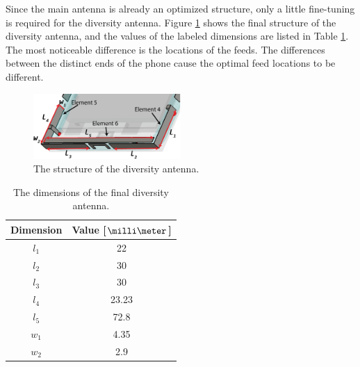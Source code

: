 Since the main antenna is already an optimized structure, only a little fine-tuning is required for the diversity antenna. Figure \ref{fig:div_final} shows the final structure of the diversity antenna, and the values of the labeled dimensions are listed in Table \ref{tab:div_final}. The most noticeable difference is the locations of the feeds. The differences between the distinct ends of the phone cause the optimal feed locations to be different. 
\begin{figure}[H]
    \centering
    \includegraphics[width=0.50\textwidth]{img/diversity_final.eps}
    \vspace{-5pt}
    \caption{The structure of the diversity antenna.}
    \label{fig:div_final}
\end{figure}
\begin{table}[H]
    \vspace{-12pt}
    \centering
    \caption{The dimensions of the final diversity antenna.}
    \label{tab:div_final}
    \vspace{-7pt}
    \begin{tabular}{|c|c|}
        \hline
        \textbf{Dimension} & \textbf{Value [$\milli\meter$]}\\
        \hline
        $l_1$ & 22 \\
        \hline
        $l_2$ & 30\\
        \hline
        $l_3$ & 30 \\
        \hline
        $l_4$ & 23.23 \\
        \hline
        $l_5$ & 72.8 \\
        \hline
        $w_1$ & 4.35\\
        \hline
        $w_2$ & 2.9\\
        \hline
    \end{tabular}
\end{table}

